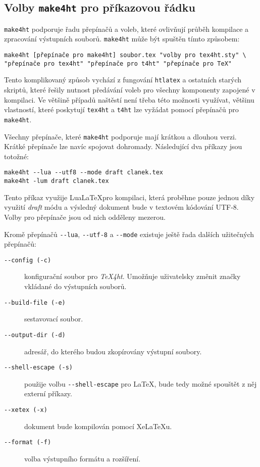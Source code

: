 \documentclass{csbulletin}
\newcommand\nazev[1]{\textit{#1}}
\newcommand\prikaz[1]{\texttt{#1}}
\newcommand\prepinac[1]{\texttt{-\/-#1}}
\begin{document}
\subsection{Volby \prikaz{make4ht} pro příkazovou řádku}

\prikaz{make4ht} podporuje řadu přepínačů a voleb, které ovlivňují průběh kompilace a zpracování výstupních souborů. \prikaz{make4ht} může být spuštěn tímto způsobem:

\begin{verbatim}
make4ht [přepínače pro make4ht] soubor.tex "volby pro tex4ht.sty" \
"přepínače pro tex4ht" "přepínače pro t4ht" "přepínače pro TeX"
\end{verbatim}

Tento komplikovaný způsob vychází z fungování \prikaz{htlatex} a ostatních
starých skriptů, které řešily nutnost předávání voleb pro všechny komponenty
zapojené v kompilaci. Ve většině případů naštěstí není třeba této možnosti
využívat, většinu vlastností, které poskytují \prikaz{tex4ht} a \prikaz{t4ht}
lze vyžádat pomocí přepínačů pro \prikaz{make4ht}.

Všechny přepínače, které \prikaz{make4ht} podporuje mají krátkou a dlouhou verzi. Krátké přepínače lze navíc spojovat dohromady. Následující dva příkazy jsou totožné:

\begin{verbatim}
make4ht --lua --utf8 --mode draft clanek.tex
make4ht -lum draft clanek.tex
\end{verbatim}

Tento příkaz využije Lua\LaTeX pro kompilaci, která proběhne pouze jednou díky
využití \nazev{draft} módu a výsledný dokument bude v textovém kódování UTF-8.
Volby pro přepínače jsou od nich odděleny mezerou.

Kromě přepínačů \prepinac{lua}, \prepinac{utf-8} a \prepinac{mode} existuje ještě řada dalších užitečných přepínačů:

\begin{description}
  \item[\prepinac{config (-c)}] konfigurační soubor pro \nazev{TeX4ht}. Umožňuje uživatelsky změnit značky vkládané do výstupních souborů.
  \item[\prepinac{build-file (-e)}] sestavovací soubor.
  \item[\prepinac{output-dir (-d)}] adresář, do kterého budou zkopírovány výstupní soubory.
  \item[\prepinac{shell-escape (-s)}] použije volbu \verb|--shell-escape| pro \LaTeX, bude tedy možné spouštět z něj externí příkazy.
  \item[\prepinac{xetex (-x)}] dokument bude kompilován pomocí Xe\LaTeX u.
  \item[\prepinac{format (-f)}] volba výstupního formátu a rozšíření.
\end{description}
\end{document}
